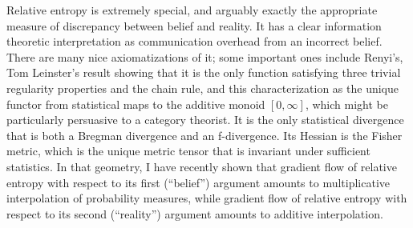 Relative entropy is extremely special, and arguably exactly the
appropriate measure of discrepancy between belief and reality.  It has
a clear information theoretic interpretation as communication overhead
from an incorrect belief.  There are many nice axiomatizations of it;
some important ones include Renyi's, Tom Leinster's result showing
that it is the only function satisfying three trivial regularity
properties and the chain rule, and this characterization as the unique
functor from statistical maps to the additive monoid $[0,\infty]$, which
might be particularly persuasive to a category theorist.  It is the
only statistical divergence that is both a Bregman divergence and an
f-divergence.  Its Hessian is the Fisher metric, which is the unique
metric tensor that is invariant under sufficient statistics. In that
geometry, I have recently shown that gradient flow of relative entropy
with respect to its first (``belief'') argument amounts to
multiplicative interpolation of probability measures, while gradient
flow of relative entropy with respect to its second (``reality'')
argument amounts to additive interpolation. 



